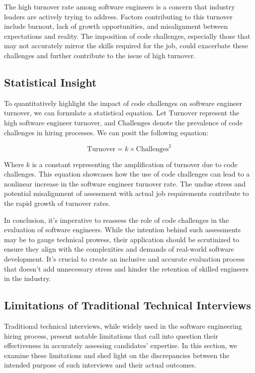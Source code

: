 \documentclass[
    a4paper, %
    10pt, %
    unnumberedsections, %
    twoside, %
]{LTJournalArticle}
\begin{document}
The high turnover rate among software engineers is a concern that industry leaders are actively trying to address. Factors contributing to this turnover include burnout, lack of growth opportunities, and misalignment between expectations and reality. The imposition of code challenges, especially those that may not accurately mirror the skills required for the job, could exacerbate these challenges and further contribute to the issue of high turnover.

\subsection{Statistical Insight}

To quantitatively highlight the impact of code challenges on software engineer turnover, we can formulate a statistical equation. Let $\text{Turnover}$ represent the high software engineer turnover, and $\text{Challenges}$ denote the prevalence of code challenges in hiring processes. We can posit the following equation:

\begin{equation}
    \text{Turnover} = k \times \text{Challenges}^2
\end{equation}

Where $k$ is a constant representing the amplification of turnover due to code challenges. This equation showcases how the use of code challenges can lead to a nonlinear increase in the software engineer turnover rate. The undue stress and potential misalignment of assessment with actual job requirements contribute to the rapid growth of turnover rates.



In conclusion, it's imperative to reassess the role of code challenges in the evaluation of software engineers. While the intention behind such assessments may be to gauge technical prowess, their application should be scrutinized to ensure they align with the complexities and demands of real-world software development. It's crucial to create an inclusive and accurate evaluation process that doesn't add unnecessary stress and hinder the retention of skilled engineers in the industry.


\subsection{Limitations of Traditional Technical Interviews}

Traditional technical interviews, while widely used in the software engineering hiring process, present notable limitations that call into question their effectiveness in accurately assessing candidates' expertise. In this section, we examine these limitations and shed light on the discrepancies between the intended purpose of such interviews and their actual outcomes.
\end{document}
